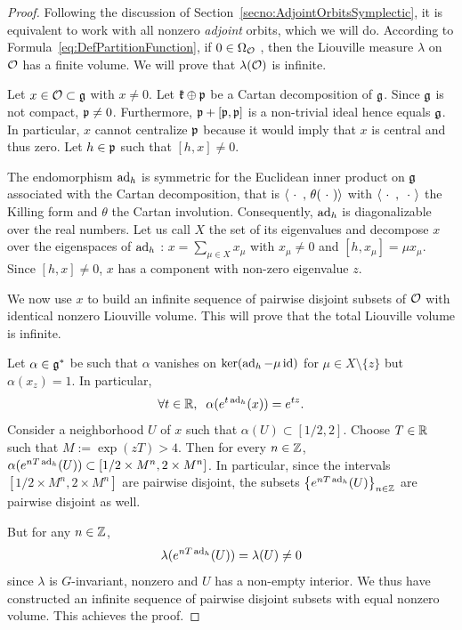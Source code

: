 \documentclass[english]{article}
\begin{document}
\begin{proof}
    Following the discussion of Section~\ref{secno:AdjointOrbitsSymplectic}, it is equivalent to work with all nonzero \emph{adjoint} orbits, which we will do.
    According to Formula~\eqref{eq:DefPartitionFunction}, if $0\in \Omega_{\mathcal{O}}$%
    , then the Liouville measure $\lambda$ on $\mathcal{O}$ has a finite volume.
    We will prove that $\lambda(\mathcal{O})$ is infinite.

    Let $x\in \mathcal{O} \subset \mathfrak g$ with $x\neq 0$.
    Let $\mathfrak k \oplus \mathfrak{p}$ be a Cartan decomposition of $\mathfrak g$. Since $\mathfrak g$ is not compact, $\mathfrak{p} \neq 0$. Furthermore, $\mathfrak{p} + [\mathfrak{p}, \mathfrak{p}]$ is a non-trivial ideal hence equals $\mathfrak g$. In particular, $x$ cannot centralize $\mathfrak{p}$ because it would imply that $x$ is central and thus zero. Let $h\in \mathfrak{p}$ such that $[h, x]\neq 0$.

    The endomorphism $\operatorname{ad}_h$ is symmetric for the Euclidean inner product on $\mathfrak g$ associated with the Cartan decomposition, that is $\left\langle {\ \cdot \ } \,,\, \theta ({\ \cdot \ }) \right\rangle$ with $\left\langle {\ \cdot \ } \,,\, {\ \cdot \ } \right\rangle$ the Killing form and $\theta$ the Cartan involution. Consequently, $\operatorname{ad}_h$ is diagonalizable over the real numbers. Let us call $X$ the set of its eigenvalues and  decompose $x$ over the eigenspaces of $\operatorname{ad}_h$ : $x = \sum_{\mu \in X} x_\mu$ with $x_\mu\neq 0$ and $[h, x_\mu] = \mu x_\mu$. Since $[h,x]\neq 0$, $x$ has a component with non-zero eigenvalue $z$.

    We now use $x$ to build an infinite sequence of pairwise disjoint subsets of $\mathcal{O}$ with identical nonzero Liouville volume. This will prove that the total Liouville volume is infinite.

    Let $\alpha\in \mathfrak g^*$ be such that $\alpha$ vanishes on $\ker (\operatorname{ad}_h - \mu \operatorname{id})$ for $\mu \in X \setminus \{z\}$ but $\alpha(x_z)=1$. In particular, 
    \[
        \forall t \in \mathbb{R}, \;\;
        \alpha(e^{t\operatorname{ad}_h} (x)) = e^{tz}
        .
    \]
    Consider a neighborhood $U$ of $x$ such that $\alpha(U) \subset [1/2,  2]$. Choose $T\in \mathbb{R}$ such that $M := \exp(z T) > 4$.
    Then for every $n\in \mathbb{Z}$, $\alpha(e^{nT\operatorname{ad}_h} (U)) \subset [1/2 \times M^n, 2\times M^n]$. In particular, since the intervals $[1/2 \times M^n, 2\times M^n]$ are pairwise disjoint, the subsets $\left\{e^{nT\operatorname{ad}_h} (U)\right\}_{n\in \mathbb{Z}}$ are pairwise disjoint as well.

    But for any $n\in \mathbb{Z}$, 
    \[
    \lambda(  e^{nT\operatorname{ad}_h} (U) )
    = \lambda(U) \neq 0
    \]
    since $\lambda$ is $G$-invariant, nonzero and $U$ has a non-empty interior. We thus have constructed an infinite sequence of pairwise disjoint subsets with equal nonzero volume. This achieves the proof.
\end{proof}
\end{document}

